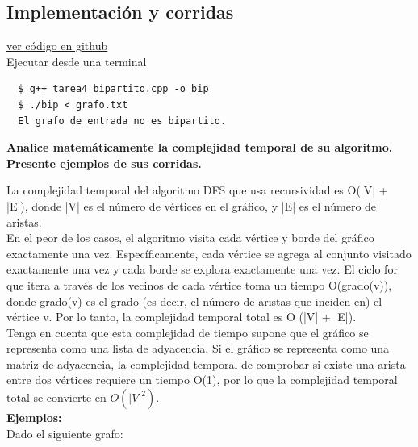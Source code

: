 \documentclass{article}
\begin{document}
\subsection{Implementación y corridas}

\href{https://github.com/luisballado/ADA/blob/main/practice_code/tarea1.cpp}{ver código en github}\\

Ejecutar desde una terminal

\begin{commandline}
\begin{verbatim}
  $ g++ tarea4_bipartito.cpp -o bip
  $ ./bip < grafo.txt
  El grafo de entrada no es bipartito.
\end{verbatim}
\end{commandline}

\newpage
\begin{question}
  \textbf{Analice matemáticamente la complejidad temporal de su algoritmo. Presente ejemplos de sus corridas.}
\end{question}

La complejidad temporal del algoritmo DFS que usa recursividad es O(|V| + |E|), donde |V| es el número de vértices en el gráfico, y |E| es el número de aristas.\\

En el peor de los casos, el algoritmo visita cada vértice y borde del gráfico exactamente una vez. Específicamente, cada vértice se agrega al conjunto visitado exactamente una vez y cada borde se explora exactamente una vez. El ciclo for que itera a través de los vecinos de cada vértice toma un tiempo O(grado(v)), donde grado(v) es el grado (es decir, el número de aristas que inciden en) el vértice v. Por lo tanto, la complejidad temporal total es O (|V| + |E|).\\

Tenga en cuenta que esta complejidad de tiempo supone que el gráfico se representa como una lista de adyacencia. Si el gráfico se representa como una matriz de adyacencia, la complejidad temporal de comprobar si existe una arista entre dos vértices requiere un tiempo O(1), por lo que la complejidad temporal total se convierte en $O(|V|^2)$.\\

\textbf{Ejemplos:}\\

Dado el siguiente grafo:
\end{document}
